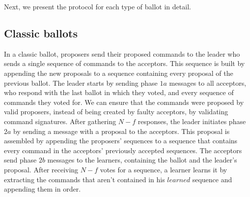 Next, we present the protocol for each type of ballot in detail.

\subsection{Classic ballots} 

In a classic ballot, proposers send their proposed commands to the leader who sends a single sequence of commands to the acceptors. This sequence is built by appending the new proposals to a sequence containing every proposal of the previous ballot. The leader starts by sending phase $1a$ messages to all acceptors, who respond with the last ballot in which they voted, and every sequence of commands they voted for. We can ensure that the commands were proposed by valid proposers, instead of being created by faulty acceptors, by validating command signatures. After gathering $N-f$ responses, the leader initiates phase $2a$ by sending a message with a proposal to the acceptors. This proposal is assembled by appending the proposers' sequences to a sequence that contains every command in the acceptors' previously accepted sequences. The acceptors send phase $2b$ messages to the learners, containing the ballot and the leader's proposal. After receiving $N-f$ votes for a sequence, a learner learns it by extracting the commands that aren't contained in his $learned$ sequence and appending them in order.

